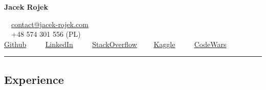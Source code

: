 \documentclass[10pt,letterpaper]{article}
\begin{document}
\begin{center}
	{\LARGE \textbf{Jacek Rojek}}
\end{center}
\begin{center}
	\ \ \href{mailto:contact@jacek-rojek.com}{contact@jacek-rojek.com}
	\\
	\ \ +48	574 301 556 (PL)\ \
	\\
	\href{https://github.com/JacekRojek}{Github} \ \ \textbullet
	\ \ \href{https://www.linkedin.com/in/jacek-rojek-b7a396105/}{LinkedIn} \ \ \textbullet
	\ \ \href{https://stackoverflow.com/users/4375103/jacek-rojek}{StackOverflow}\ \ \textbullet
	\ \ \href{https://www.kaggle.com/jacek123}{Kaggle} \ \ \textbullet
	\ \ \href{https://www.codewars.com/users/JacekRojek}{CodeWars}

\end{center}

\hrule
\vspace{-0.4em}
\subsection*{Experience}
\end{document}
